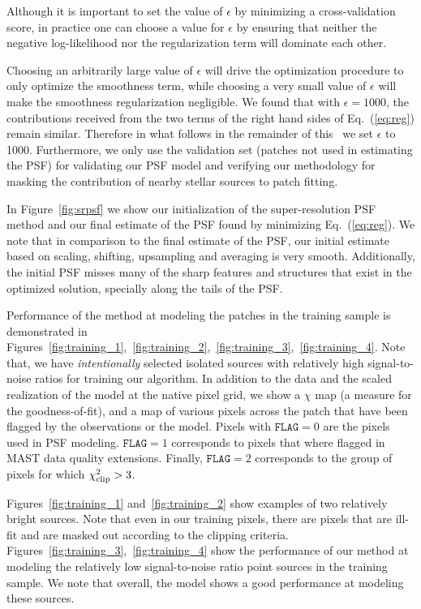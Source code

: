 Although it is important to set the value of $\epsilon$ by minimizing a cross-validation score, in practice one can choose a 
value for $\epsilon$ by ensuring that neither the negative log-likelihood nor the regularization term will dominate each other. 

Choosing an arbitrarily large value of $\epsilon$ will drive the optimization procedure to only optimize the smoothness term, while choosing a very small 
value of $\epsilon$ will make the smoothness regularization negligible. We found that with $\epsilon = 1000$, the contributions received from the two terms 
of the right hand sides of Eq.~(\ref{eq:reg}) remain similar. Therefore in what follows in the remainder of this \paper\ we set $\epsilon$  to 1000.
Furthermore, we only use the validation set (patches not used in estimating the PSF) for validating our PSF model and verifying our 
methodology for masking the contribution of nearby stellar sources to patch fitting.  

In Figure~\ref{fig:srpsf} we show our initialization of the super-resolution PSF method and our final estimate of the PSF found by
minimizing Eq.~(\ref{eq:reg}). We note that in comparison to the final estimate of the PSF, our initial estimate based on scaling, shifting, 
upsampling and averaging is very smooth. Additionally, the initial PSF misses many of the sharp features and structures that exist in the optimized solution, specially along the tails of the PSF.

Performance of the method at modeling the patches in the training sample is demonstrated in Figures~\ref{fig:training_1},~\ref{fig:training_2},~\ref{fig:training_3},~\ref{fig:training_4}. 
Note that, we have \emph{intentionally} selected isolated sources with relatively high signal-to-noise ratios for training our algorithm. In addition to the data and the scaled realization of the model at the native pixel grid, we show a $\chi$ map (a measure for the goodness-of-fit), and a map of various pixels across the patch that have been flagged by the observations or the model. Pixels with $\mathtt{FLAG}=0$ are the pixels used in PSF modeling. $\mathtt{FLAG}=1$ corresponds to pixels that where flagged in MAST data quality extensions. Finally, $\mathtt{FLAG}=2$ corresponds to the group of pixels for which $\chi^{2}_{\rm clip}>3$. 

Figures~\ref{fig:training_1} and~\ref{fig:training_2} show examples of two relatively bright sources. Note that even in our training pixels, there are pixels that are ill-fit and are masked out according to the clipping criteria. Figures~\ref{fig:training_3},~\ref{fig:training_4} show the performance of our method at modeling the relatively low signal-to-noise ratio point sources in the training sample. We note that overall, the model shows a good performance at modeling these sources.

